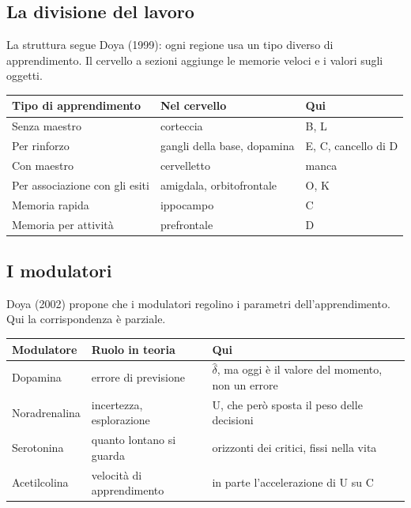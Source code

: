 \documentclass[11pt,a4paper]{article}
\begin{document}
\subsection{La divisione del lavoro}

La struttura segue Doya (1999): ogni regione usa un tipo diverso di apprendimento. Il
cervello a sezioni aggiunge le memorie veloci e i valori sugli oggetti.

\begin{center}
\begin{tabularx}{\textwidth}{lYY}
\toprule
\textbf{Tipo di apprendimento} & \textbf{Nel cervello} & \textbf{Qui} \\
\midrule
Senza maestro & corteccia & B, L \\
Per rinforzo & gangli della base, dopamina & E, C, cancello di D \\
Con maestro & cervelletto & manca \\
Per associazione con gli esiti & amigdala, orbitofrontale & O, K \\
Memoria rapida & ippocampo & C \\
Memoria per attività & prefrontale & D \\
\bottomrule
\end{tabularx}
\end{center}

\subsection{I modulatori}

Doya (2002) propone che i modulatori regolino i parametri dell'apprendimento. Qui la
corrispondenza è parziale.

\begin{center}
\begin{tabularx}{\textwidth}{lYY}
\toprule
\textbf{Modulatore} & \textbf{Ruolo in teoria} & \textbf{Qui} \\
\midrule
Dopamina & errore di previsione & $\hat\delta$, ma oggi è il valore del momento, non un errore \\
Noradrenalina & incertezza, esplorazione & U, che però sposta il peso delle decisioni \\
Serotonina & quanto lontano si guarda & orizzonti dei critici, fissi nella vita \\
Acetilcolina & velocità di apprendimento & in parte l'accelerazione di U su C \\
\bottomrule
\end{tabularx}
\end{center}
\end{document}
